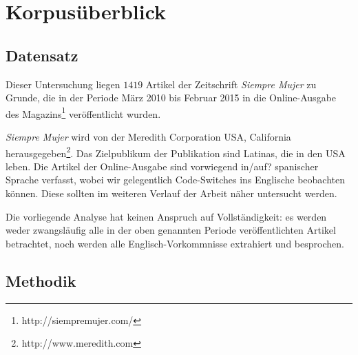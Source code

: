 \section{Korpusüberblick}


\subsection{Datensatz}

Dieser Untersuchung liegen $1419$ Artikel der Zeitschrift \textit{Siempre Mujer} zu Grunde,
die in der Periode März 2010 bis Februar 2015 in die Online-Ausgabe des Magazins\footnote{http://siempremujer.com/} veröffentlicht wurden.

\textit{Siempre Mujer} wird von der Meredith Corporation USA, California herausgegeben\footnote{http://www.meredith.com}.
Das Zielpublikum der Publikation sind Latinas, die in den USA leben. %
Die Artikel der Online-Ausgabe sind vorwiegend in/auf? spanischer Sprache verfasst,
wobei wir gelegentlich Code-Switches ins Englische beobachten können.
Diese sollten im weiteren Verlauf der Arbeit näher untersucht werden.

Die vorliegende Analyse hat keinen Anspruch auf Vollständigkeit:
es werden weder zwangsläufig alle in der oben genannten Periode veröffentlichten Artikel betrachtet,
noch werden alle Englisch-Vorkommnisse extrahiert und besprochen.



\subsection{Methodik}

